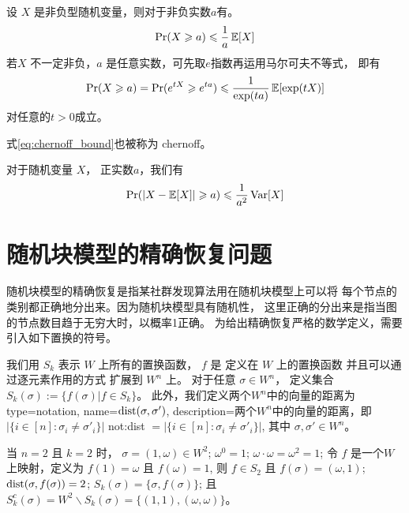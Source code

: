 \begin{lemma}[马尔可夫不等式]
  设 $X$ 是非负型随机变量，则对于非负实数$a$有。
  \begin{equation}
    \Pr(X\geqslant a) \leqslant {1 \over a} \operatorname{\mathbb{E}}[X]   
  \end{equation}
   若$X$ 不一定非负，$a$ 是任意实数，可先取$e$指数再运用马尔可夫不等式，
   即有
   \begin{equation}\label{eq:chernoff_bound}
    \Pr(X\geqslant a) = \Pr(e^{tX} \geqslant e^{ta}) \leqslant { 1 \over \exp(ta)} \operatorname{\mathbb{E}}[\exp(tX)]
   \end{equation}
   对任意的$t>0$成立。

   式\eqref{eq:chernoff_bound}也被称为 \gls{chernoff}。
\end{lemma}
\begin{lemma}[切比雪夫不等式]
  对于随机变量 $X$， 正实数$a$，我们有
  \begin{equation}
    \Pr(\lvert X-\operatorname{\mathbb{E}}[X]\rvert \geqslant a) \leqslant {1 \over a^2} \operatorname{\mathrm{Var}}[X]
  \end{equation}
\end{lemma}


\section{随机块模型的精确恢复问题}\label{sec:exact_recovery}
随机块模型的精确恢复是指某社群发现算法用在随机块模型上可以将
每个节点的类别都正确地分出来。因为随机块模型具有随机性，
这里正确的分出来是指当图的节点数目趋于无穷大时，以概率1正确。
为给出精确恢复严格的数学定义，需要引入如下置换的符号。


我们用 $S_k$ 表示 $W$  上所有的置换函数， 
$f$ 是 定义在 $W$ 上的置换函数
并且可以通过逐元素作用的方式
扩展到 $W^n$ 上。
对于任意 $\sigma \in W^n$，
定义集合 $S_k(\sigma):=\{f(\sigma)| f\in S_k\}$。
此外，我们定义两个$W^n$中的向量的距离为
{
  type=notation,
  name={$\operatorname{dist}(\sigma, \sigma')$},
  description={两个$W^n$中的向量的距离，即$|\{i\in[n]:\sigma_i\neq \sigma'_i\}|$}
}
\gls{not:dist}
$=|\{i\in[n]:\sigma_i\neq \sigma'_i\}|$,
其中 $\sigma,\sigma'\in W^n
$。
\begin{example}
当 $n=2$ 且 $k=2$ 时，
$\sigma=(1, \omega) \in W^2$;
$\omega^0 = 1$; $\omega \cdot \omega = \omega^2 = 1$;
令 $f$ 是一个$W$上映射，定义为
$f(1) = \omega$ 且 $f(\omega)=1$,
则 $f \in S_2$ 且 $f(\sigma) = (\omega, 1)$;
$\operatorname{dist}(\sigma, f(\sigma)) = 2$;
$S_k(\sigma) = \{\sigma, f(\sigma)\}$; 且
$S_k^c(\sigma) = W^2 \backslash S_k(\sigma)
=\{(1, 1), (\omega, \omega)\}$。
\end{example}

